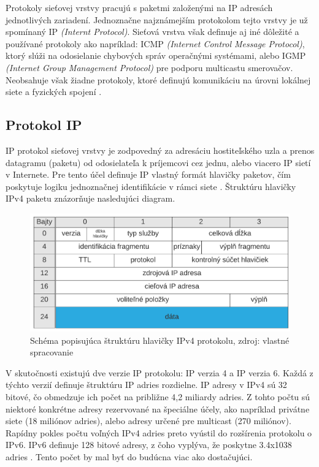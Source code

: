 \documentclass[
  printed, %
  table,   %
  lof,     %
  nolot,   %
  nocover
]{fithesis3}
\begin{document}
Protokoly sieťovej vrstvy pracujú s paketmi založenými na IP adresách
jednotlivých zariadení. Jednoznačne najznámejším protokolom tejto vrstvy je už
spomínaný IP \textit{(Internt Protocol)}. Sieťová vrstva však definuje aj iné
dôležité a používané protokoly ako napríklad: ICMP
\textit{(Internet Control Message Protocol)}, ktorý slúži na odosielanie
chybových správ operačnými systémami, alebo IGMP
\textit{(Internet Group Management Protocol)} pre podporu multicastu smerovačov.
Neobsahuje však žiadne protokoly, ktoré definujú komunikáciu na
úrovni lokálnej siete a fyzických spojení \cite{rfc1122}.

\subsection{Protokol IP}
IP protokol sieťovej vrstvy je zodpovedný za adresáciu hostiteľského uzla a
prenos datagramu (paketu) od odosielateľa k príjemcovi cez jednu, alebo viacero
IP sietí v Internete. Pre tento účel definuje IP vlastný formát hlavičky paketov, čím
poskytuje logiku jednoznačnej identifikácie v rámci siete \cite{rfc791}. Štruktúru hlavičky
IPv4 paketu znázorňuje nasledujúci diagram.

\begin{figure}[h]
  \centering
    \includegraphics[width=.95\textwidth]{images/net-ip-head.png}
  \caption{Schéma popisujúca štruktúru hlavičky IPv4 protokolu, zdroj: vlastné spracovanie}
  \label{fig:net-ip-head}
\end{figure}

V skutočnosti existujú dve verzie IP protokolu: IP verzia 4 a IP verzia 6.
Každá z týchto verzií definuje štruktúru IP adries rozdielne. IP adresy v IPv4
sú 32 bitové, čo obmedzuje ich počet na približne 4,2 miliardy adries. Z tohto
počtu sú niektoré konkrétne adresy rezervované na špeciálne účely, ako napríklad
privátne siete (18 miliónov adries), alebo adresy určené pre multicast
(270 miliónov). Rapídny pokles počtu voľných IPv4 adries preto vyústil do
rozšírenia protokolu o IPv6. IPv6 definuje 128 bitové adresy, z čoho vyplýva,
že poskytne 3.4x1038 adries \cite{rfc1752}. Tento počet by mal byť do budúcna viac ako
dostačujúci.
\end{document}
